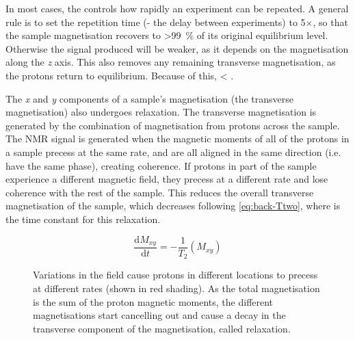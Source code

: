 In most cases, the \Tone controls how rapidly an experiment can be repeated.
A general rule is to set the repetition time (\TR - the delay between experiments) to 5$\times$\Tone, so that the sample magnetisation recovers to \SI{>99}{\percent} of its original equilibrium level.
Otherwise the signal produced will be weaker, as it depends on the magnetisation along the \textit{z} axis.
This also removes any remaining transverse magnetisation, as the protons return to equilibrium.
Because of this, \Ttwo < \Tone.

The \textit{x} and \textit{y} components of a sample's magnetisation (the transverse magnetisation) also undergoes relaxation.
The transverse magnetisation is generated by the combination of magnetisation from protons across the sample.
The NMR signal is generated when the magnetic moments of all of the protons in a sample precess at the same rate, and are all aligned in the same direction (i.e. have the same phase), creating coherence.
If protons in part of the sample experience a different magnetic field, they precess at a different rate and lose coherence with the rest of the sample.
This reduces the overall transverse magnetisation of the sample, which decreases following \autoref{eq:back-Ttwo}, where \Ttwo is the time constant for this relaxation.

\begin{equation}
\frac{\mathrm{d}M_{xy}}{\mathrm{d}t} = - \frac{1}{T_2} (M_{xy})
\label{eq:back-Ttwo}
\end{equation}

\begin{figure}[t]
\centering
{}
\caption[Transverse relaxation due to an inhomogeneous field]{Variations in the \Bzero field cause protons in different locations to precess at different rates (shown in red shading). As the total magnetisation is the sum of the proton magnetic moments, the different magnetisations start cancelling out and cause a decay in the transverse component of the magnetisation, called \Ttwostar relaxation.}
\label{fig:back-T2}
\end{figure}

